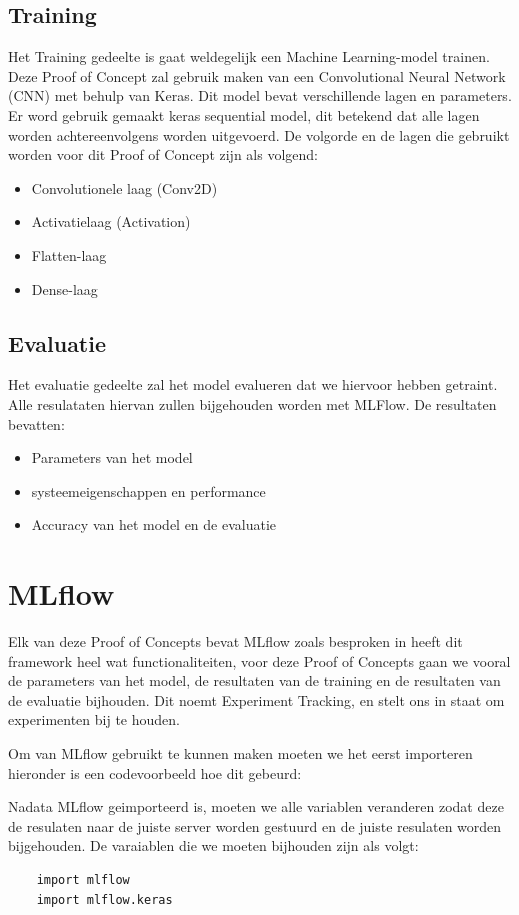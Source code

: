 \subsection{Training}
Het Training gedeelte is gaat weldegelijk een Machine Learning-model trainen. Deze Proof of Concept zal gebruik maken van een Convolutional Neural Network (CNN) met behulp van Keras. Dit model bevat verschillende lagen en parameters.
Er word gebruik gemaakt keras sequential model, dit betekend dat alle lagen worden achtereenvolgens worden uitgevoerd. De volgorde en de lagen die gebruikt worden voor dit Proof of Concept zijn als volgend:
\begin{itemize}
    \item Convolutionele laag (Conv2D)
    \item Activatielaag (Activation)
    \item Flatten-laag
    \item Dense-laag
\end{itemize}
\subsection{Evaluatie}
Het evaluatie gedeelte zal het model evalueren dat we hiervoor hebben getraint. Alle resulataten hiervan zullen bijgehouden worden met MLFlow. De resultaten bevatten:
\begin{itemize}
    \item Parameters van het model
    \item systeemeigenschappen en performance
    \item Accuracy van het model en de evaluatie
\end{itemize}

\section{MLflow}
Elk van deze Proof of Concepts bevat MLflow zoals besproken in heeft dit framework heel wat functionaliteiten, voor deze Proof of Concepts gaan we vooral de parameters van het model, de resultaten van de training en de resultaten van de evaluatie bijhouden.
Dit noemt Experiment Tracking, en stelt ons in staat om experimenten bij te houden.

Om van MLflow gebruikt te kunnen maken moeten we het eerst importeren hieronder is een codevoorbeeld hoe dit gebeurd:

Nadata MLflow geimporteerd is, moeten we alle variablen veranderen zodat deze de resulaten naar de juiste server worden gestuurd en de juiste resulaten worden bijgehouden.
De varaiablen die we moeten bijhouden zijn als volgt:
\begin{verbatim}
    import mlflow
    import mlflow.keras
\end{verbatim}

